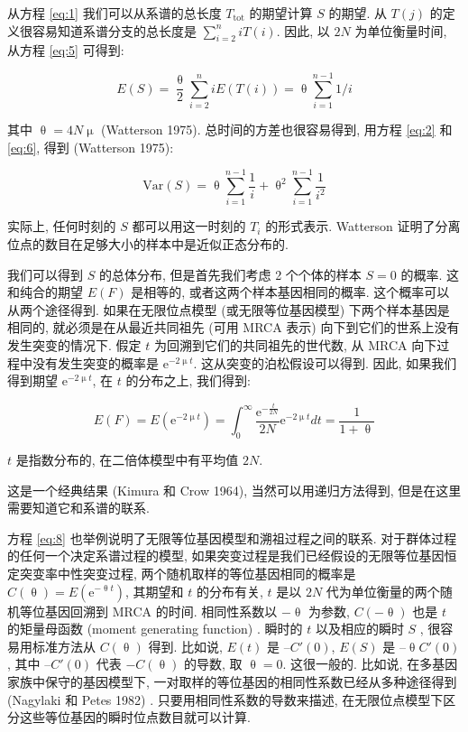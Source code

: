 \documentclass[12pt]{article}
\begin{document}
从方程 \ref{eq:1} 我们可以从系谱的总长度 $T_{\text{tot}}$ 的期望计算 $S$ 的期望. 从 $T(j)$
的定义很容易知道系谱分支的总长度是 $\sum_{i=2}^{n} i T(i)$. 因此, 以 $2N$ 为单位衡量时间, 从方程
\ref{eq:5} 可得到:

\begin{equation} \label{eq:6}
    E(S)=\frac{\uptheta}{2} \sum_{i=2}^{n} iE(T(i)) = \uptheta \sum_{i=1}^{n-1}1/i
\end{equation}

其中 $\uptheta = 4N \upmu$ (Watterson 1975). 总时间的方差也很容易得到, 用方程 \ref{eq:2} 和 \ref{eq:6}, 得到
(Watterson 1975):

\begin{equation} \label{eq:7}
    \text{Var}(S) = \uptheta \sum_{i=1}^{n-1} \frac{1}{i} + \uptheta^{2} \sum_{i=1}^{n-1} \frac{1}{i^{2}}
\end{equation}

实际上, 任何时刻的 $S$ 都可以用这一时刻的 $T_{i}$ 的形式表示. Watterson
证明了分离位点的数目在足够大小的样本中是近似正态分布的.

我们可以得到 $S$ 的总体分布, 但是首先我们考虑 2 个个体的样本 $S=0$ 的概率. 这和纯合的期望 $E(F)$ 是相等的,
或者这两个样本基因相同的概率. 这个概率可以从两个途径得到. 如果在无限位点模型 (或无限等位基因模型) 下两个样本基因是相同的,
就必须是在从最近共同祖先 (可用 MRCA 表示) 向下到它们的世系上没有发生突变的情况下. 假定 $t$
为回溯到它们的共同祖先的世代数, 从 MRCA 向下过程中没有发生突变的概率是 $\mathrm{e}^{-2\upmu t}$.
这从突变的泊松假设可以得到. 因此, 如果我们得到期望 $\mathrm{e}^{-2\upmu t}$, 在 $t$ 的分布之上, 我们得到:

\begin{equation} \label{eq:8}
    E(F) = E(\mathrm{e}^{-2\upmu t}) = \int_{0}^{\infty} \frac{\mathrm{e}^{-\frac{t}{2N}}}{2N}\mathrm{e}^{-2\upmu t} dt = \frac{1}{1+\uptheta}
\end{equation}

$t$ 是指数分布的, 在二倍体模型中有平均值 $2N$.

这是一个经典结果 (Kimura 和 Crow 1964), 当然可以用递归方法得到, 但是在这里需要知道它和系谱的联系.

方程 \ref{eq:8} 也举例说明了无限等位基因模型和溯祖过程之间的联系. 对于群体过程的任何一个决定系谱过程的模型,
如果突变过程是我们已经假设的无限等位基因恒定突变率中性突变过程, 两个随机取样的等位基因相同的概率是 $C(\uptheta
)=E(\mathrm{e}^{-\uptheta t})$, 其期望和 $t$ 的分布有关, $t$ 是以 $2N$ 代为单位衡量的两个随机等位基因回溯到 MRCA
的时间. 相同性系数以 $-\uptheta$ 为参数, $C(-\uptheta )$ 也是 $t$ 的矩量母函数 (moment generating function) .
瞬时的 $t$ 以及相应的瞬时 $S$ , 很容易用标准方法从 $C(\uptheta )$ 得到. 比如说, $E(t)$ 是 $–C'(0)$, $E(S)$ 是
$–\uptheta C'(0)$, 其中 $–C'(0)$ 代表 $-C(\uptheta )$ 的导数, 取 $\uptheta = 0$. 这很一般的. 比如说,
在多基因家族中保守的基因模型下, 一对取样的等位基因的相同性系数已经从多种途径得到 (Nagylaki 和 Petes 1982) .
只要用相同性系数的导数来描述, 在无限位点模型下区分这些等位基因的瞬时位点数目就可以计算.
\end{document}
